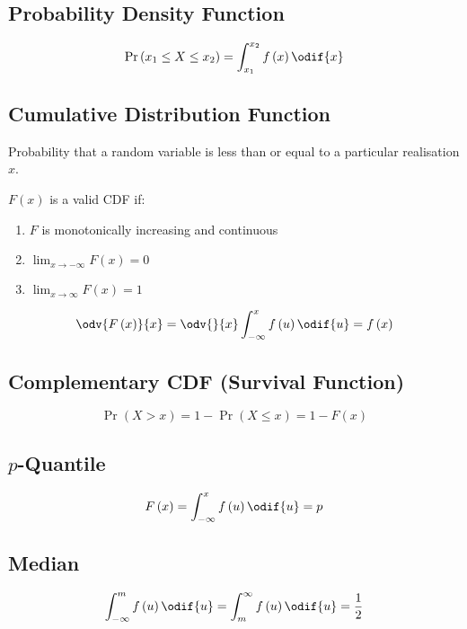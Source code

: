 \documentclass{article}
\begin{document}
\begin{minipage}{126.1962963mm}
\begin{multicols}{2}
        \subsection{Probability Density Function}
        \begin{equation*}
            \Pr{\left( x_1 \leq X \leq x_2 \right)} = \int_{x_1}^{x_2} f\left( x \right) \odif{x}
        \end{equation*}
        \subsection{Cumulative Distribution Function}
        Probability that a random variable is
        less than or equal to a particular realisation \(x\).

        \(F\left( x \right)\) is a valid CDF if:
        \begin{enumerate}
            \item \(F\) is monotonically increasing and continuous
            \item \(\lim_{x \to -\infty} F\left( x \right) = 0\)
            \item \(\lim_{x \to \infty} F\left( x \right) = 1\)
        \end{enumerate}
        \begin{equation*}
            \odv{F\left( x \right)}{x} = \odv{}{x} \int_{-\infty}^x f\left( u \right) \odif{u} = f\left( x \right)
        \end{equation*}
        \subsection{Complementary CDF (Survival Function)}
        \begin{equation*}
            \Pr{\left( X > x \right)} = 1 - \Pr{\left( X \leq x \right)} = 1 - F\left( x \right)
        \end{equation*}
        \subsection{\texorpdfstring{\(p\)}{p}-Quantile}
        \begin{equation*}
            F\left( x \right) = \int_{-\infty}^x f\left( u \right) \odif{u} = p
        \end{equation*}
        \subsection{Median}
        \begin{equation*}
            \int_{-\infty}^m f\left( u \right) \odif{u} = \int^{\infty}_m f\left( u \right) \odif{u} = \frac{1}{2}
        \end{equation*}

\end{multicols}
\end{minipage}
\end{document}
